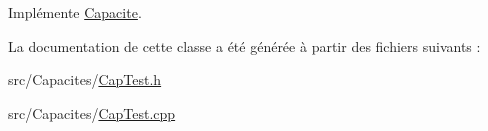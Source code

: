 Implémente \hyperlink{class_capacite_a6f5e6efda11f80ab8538e23f5bdc6e79}{Capacite}.



La documentation de cette classe a été générée à partir des fichiers suivants \+:\begin{DoxyCompactItemize}
\item 
src/\+Capacites/\hyperlink{_cap_test_8h}{Cap\+Test.\+h}\item 
src/\+Capacites/\hyperlink{_cap_test_8cpp}{Cap\+Test.\+cpp}\end{DoxyCompactItemize}

